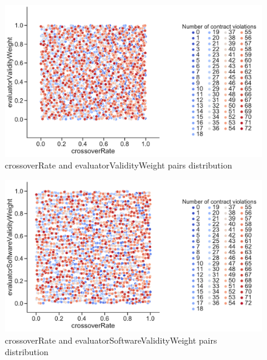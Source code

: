\begin{figure}
	\centering
	\includegraphics[width=\textwidth]{images/PairsDistr/crossoverRate_evaluatorValidityWeight.pdf}
	\caption[crossoverRate and evaluatorValidityWeight pairs distribution]{crossoverRate and evaluatorValidityWeight pairs distribution}
	\label{fig:crossoverRate_evaluatorValidityWeight_pair}
\end{figure}
\clearpage
\begin{figure}
	\centering
	\includegraphics[width=\textwidth]{images/PairsDistr/crossoverRate_evaluatorSoftwareValidityWeight.pdf}
	\caption[crossoverRate and evaluatorSoftwareValidityWeight pairs distribution]{crossoverRate and evaluatorSoftwareValidityWeight pairs distribution}
	\label{fig:crossoverRate_evaluatorSoftwareValidityWeight_pair}
\end{figure}
\clearpage
